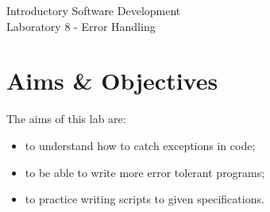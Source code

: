 \documentclass[12pt,oneside]{cttutorial}
\begin{document}
\tutorialextra{}


 

\newcommand{\xkcd}[2]{
	\begin{center}
	\texttt{[image: ../../Figures/png/\#1]}
	\newline
	\url{http://xkcd.com/#2}
	\end{center}
	\bigskip
}

\newcommand{\alert}[1]
{\marginpar
  {\makebox[0 pt][l]
    {\texttt{[image: ../../Figures/png/warning.png]}
  }
  \parbox{2 cm}{{\sffamily \bfseries \tiny #1}}}}


\renewcommand{\baselinestretch}{1.5}
\textwidth=15cm

\newcommand{\I}{j}

\begin{center}
\begin{bfseries}
Introductory Software Development\\Laboratory 8 - Error Handling
\end{bfseries}
\end{center}

\section{Aims \& Objectives}

The aims of this lab are:

\begin{itemize}
\item to understand how to catch exceptions in code;
\item to be able to write more error tolerant programs;
\item to practice writing scripts to given specifications.
\end{itemize}
\end{document}
